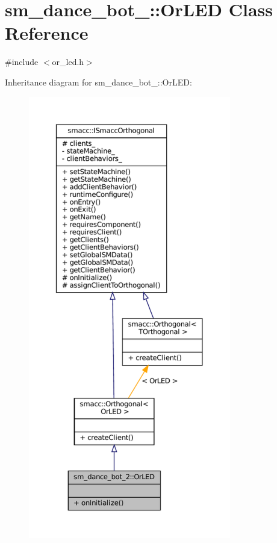 \hypertarget{classsm__dance__bot__2_1_1OrLED}{}\section{sm\+\_\+dance\+\_\+bot\+\_\+:\+:Or\+L\+ED Class Reference}
\label{classsm__dance__bot__2_1_1OrLED}


{\ttfamily \#include $<$or\+\_\+led.\+h$>$}



Inheritance diagram for sm\+\_\+dance\+\_\+bot\+\_\+:\+:Or\+L\+ED\+:
\nopagebreak
\begin{figure}[H]
\begin{center}
\leavevmode
\includegraphics[height=550pt]{classsm__dance__bot__2_1_1OrLED__inherit__graph}
\end{center}
\end{figure}


